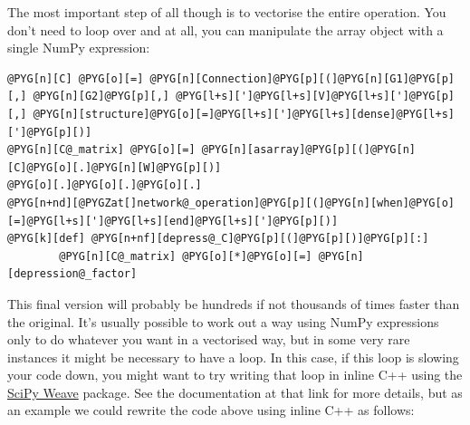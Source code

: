 \documentclass[letterpaper,10pt,english]{manual}
\begin{document}
The most important step of all though is to vectorise the entire operation. You
don't need to loop over  and  at all, you can manipulate the array
object with a single NumPy expression:

\begin{Verbatim}[commandchars=@\[\]]
@PYG[n][C] @PYG[o][=] @PYG[n][Connection]@PYG[p][(]@PYG[n][G1]@PYG[p][,] @PYG[n][G2]@PYG[p][,] @PYG[l+s][']@PYG[l+s][V]@PYG[l+s][']@PYG[p][,] @PYG[n][structure]@PYG[o][=]@PYG[l+s][']@PYG[l+s][dense]@PYG[l+s][']@PYG[p][)]
@PYG[n][C@_matrix] @PYG[o][=] @PYG[n][asarray]@PYG[p][(]@PYG[n][C]@PYG[o][.]@PYG[n][W]@PYG[p][)]
@PYG[o][.]@PYG[o][.]@PYG[o][.]
@PYG[n+nd][@PYGZat[]network@_operation]@PYG[p][(]@PYG[n][when]@PYG[o][=]@PYG[l+s][']@PYG[l+s][end]@PYG[l+s][']@PYG[p][)]
@PYG[k][def] @PYG[n+nf][depress@_C]@PYG[p][(]@PYG[p][)]@PYG[p][:]
        @PYG[n][C@_matrix] @PYG[o][*]@PYG[o][=] @PYG[n][depression@_factor]
\end{Verbatim}

This final version will probably be hundreds if not thousands of times faster
than the original. It's usually possible to work out a way using NumPy
expressions only to do whatever you want in a vectorised way, but in some
very rare instances it might be necessary to have a loop. In this case, if
this loop is slowing your code down, you might want to try writing that
loop in inline C++ using the \href{http://www.scipy.org/Weave}{SciPy Weave}
package. See the documentation at that link for more details, but as an
example we could rewrite the code above using inline C++ as follows:
\end{document}
